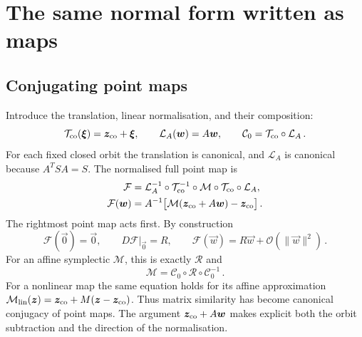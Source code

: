 



\section{The same normal form written as maps}
\label{sec:lnf-maps}

\subsection{Conjugating point maps}

Introduce the translation, linear normalisation, and their composition:
\begin{equation}\label{eq:lnf-embedding}
    \mathcal T_{\rm co}(\vec\xi) = \vec z_{\rm co} + \vec\xi,
    \qquad \mathcal L_A(\vec w) = A\vec w,
    \qquad \mathcal C_0 = \mathcal T_{\rm co}\circ\mathcal L_A\,.
\end{equation}
For each fixed closed orbit the translation is canonical, and $\mathcal L_A$
is canonical because $A^TSA = S$. The normalised full point map is
\begin{align}\label{eq:lnf-normalised-map}
    \mathcal F
    & = \mathcal L_A^{-1}\circ\mathcal T_{\rm co}^{-1}
    \circ\mathcal M\circ\mathcal T_{\rm co}\circ\mathcal L_A,\\
    \mathcal F(\vec w)
    & = A^{-1}\bigl[\mathcal M(\vec z_{\rm co} + A\vec w)-\vec z_{\rm co}\bigr]\,.
\end{align}
The rightmost point map acts first. By construction
\begin{equation}
    \mathcal F(\vec0) = \vec0,\qquad D\mathcal F|_{\vec0} = R,
    \qquad \mathcal F(\vec w) = R\vec w + \mathcal O(\|\vec w\|^2)\,.
\end{equation}
For an affine symplectic $\mathcal M$, this is exactly $\mathcal R$ and
\begin{equation}\label{eq:lnf-map-factorization}
    \mathcal M = \mathcal C_0\circ\mathcal R\circ\mathcal C_0^{-1}\,.
\end{equation}
For a nonlinear map the same equation holds for its affine approximation
$\mathcal M_{\rm lin}(\vec z) = \vec z_{\rm co} + M(\vec z-\vec z_{\rm co})$.
Thus matrix similarity has become canonical conjugacy of point maps.
The argument $\vec z_{\rm co} + A\vec w$ makes explicit both the orbit
subtraction and the direction of the normalisation.

